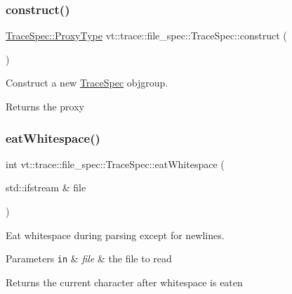 \subsubsection{\texorpdfstring{construct()}{construct()}}
{\footnotesize\ttfamily \hyperlink{structvt_1_1trace_1_1file__spec_1_1_trace_spec_a26160cff9bb5115866943ed823405f1f}{Trace\+Spec\+::\+Proxy\+Type} vt\+::trace\+::file\+\_\+spec\+::\+Trace\+Spec\+::construct (\begin{DoxyParamCaption}{ }\end{DoxyParamCaption})\hspace{0.3cm}{\ttfamily [static]}}



Construct a new {\ttfamily \hyperlink{structvt_1_1trace_1_1file__spec_1_1_trace_spec}{Trace\+Spec}} objgroup. 

\begin{DoxyReturn}{Returns}
the proxy 
\end{DoxyReturn}
\mbox{\label{structvt_1_1trace_1_1file__spec_1_1_trace_spec_a372568633fa39959d508984e5eb2ff96}} 
\subsubsection{\texorpdfstring{eat\+Whitespace()}{eatWhitespace()}}
{\footnotesize\ttfamily int vt\+::trace\+::file\+\_\+spec\+::\+Trace\+Spec\+::eat\+Whitespace (\begin{DoxyParamCaption}\item[{std\+::ifstream \&}]{file }\end{DoxyParamCaption})\hspace{0.3cm}{\ttfamily [private]}}



Eat whitespace during parsing except for newlines. 


\begin{DoxyParams}[1]{Parameters}
\mbox{\tt in}  & {\em file} & the file to read\\
\hline
\end{DoxyParams}
\begin{DoxyReturn}{Returns}
the current character after whitespace is eaten 
\end{DoxyReturn}
\mbox{\label{structvt_1_1trace_1_1file__spec_1_1_trace_spec_ad83e3bc71e3ebcd794fc38e7c2b7a74c}} 
